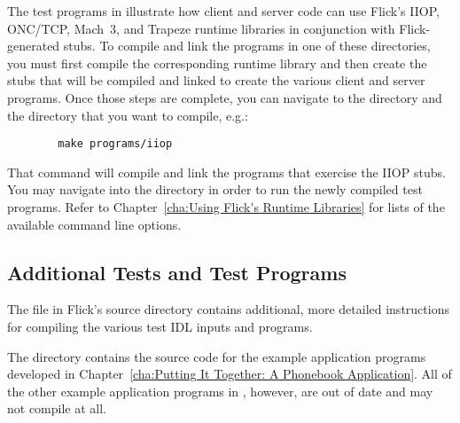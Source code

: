 The test programs in  illustrate how client and
server code can use Flick's IIOP, ONC/TCP, Mach~3, and Trapeze runtime
libraries in conjunction with Flick-generated stubs.
To compile and link the programs in one of these directories, you must first
compile the corresponding runtime library and then create the stubs that will
be compiled and linked to create the various client and server programs.  Once
those steps are complete, you can navigate to the  directory and
 the directory that you want to compile, e.g.:

\begin{verbatim}
        make programs/iiop
\end{verbatim}

\noindent That command will compile and link the programs that exercise the
IIOP stubs.  You may navigate into the  directory in
order to run the newly compiled test programs.  Refer to Chapter~\ref{cha:Using
Flick's Runtime Libraries} for lists of the available command line options.



\subsection{Additional Tests and Test Programs}
\label{subsec:Additional Tests and Test Programs}

The  file in Flick's  source directory contains
additional, more detailed instructions for compiling the various test IDL
inputs and programs.

The  directory contains the source code for the
example application programs developed in Chapter~\ref{cha:Putting It Together:
A Phonebook Application}.  All of the other example application programs in
, however, are out of date and may not compile at all.




